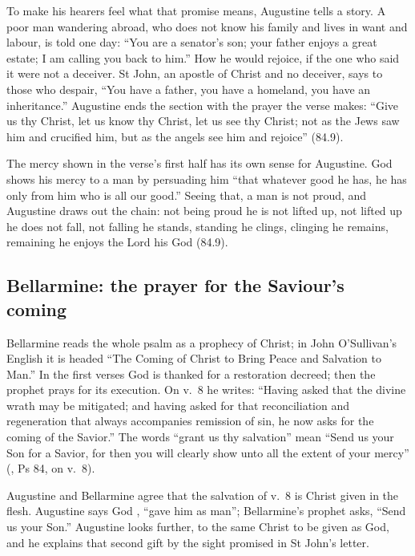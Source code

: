 To make his hearers feel what that promise means, Augustine tells a story. A
poor man wandering abroad, who does not know his family and lives in want and
labour, is told one day: ``You are a senator's son; your father enjoys a great
estate; I am calling you back to him.'' How he would rejoice, if the one who
said it were not a deceiver. St John, an apostle of Christ and no deceiver,
says to those who despair, ``You have a father, you have a homeland, you have an
inheritance.'' Augustine ends the section with the prayer the verse makes:
``Give us thy Christ, let us know thy Christ, let us see thy Christ; not as the
Jews saw him and crucified him, but as the angels see him and rejoice''
(84.9).

The mercy shown in the verse's first half has its own sense for Augustine.
God shows his mercy to a man by persuading him ``that whatever good he has, he
has only from him who is all our good.'' Seeing that, a man is not proud, and
Augustine draws out the chain: not being proud he is not lifted up, not lifted
up he does not fall, not falling he stands, standing he clings, clinging he
remains, remaining he enjoys the Lord his God (84.9).

\subsection{Bellarmine: the prayer for the Saviour's coming}

Bellarmine reads the whole psalm as a prophecy of Christ; in John
O'Sullivan's English it is headed ``The Coming of Christ to Bring Peace and
Salvation to Man.'' In the first verses
God is thanked for a restoration decreed; then the prophet prays for its
execution. On v.~8 he writes: ``Having asked that the divine wrath may be
mitigated; and having asked for that reconciliation and regeneration that
always accompanies remission of sin, he now asks for the coming of the
Savior.'' The words ``grant us thy salvation'' mean ``Send us your Son for a
Savior, for then you will clearly show unto all the extent of your mercy''
(, Ps 84, on v.~8).

Augustine and Bellarmine agree that the salvation of v.~8 is Christ given in
the flesh. Augustine says God , ``gave him as
man''; Bellarmine's prophet asks, ``Send us your Son.'' Augustine looks
further, to the same Christ to be given as God, and he explains that second
gift by the sight promised in St John's letter.

